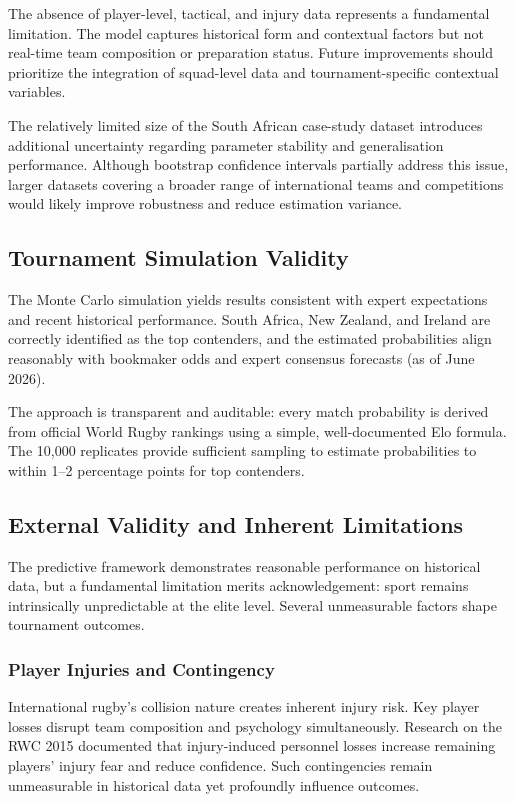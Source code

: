 \documentclass[12pt,a4paper,onecolumn]{article}
\begin{document}
The absence of player-level, tactical, and injury data represents a fundamental limitation. \cite{Williams2016,Hurley2016} The model captures historical form and contextual factors but not real-time team composition or preparation status. Future improvements should prioritize the integration of squad-level data and tournament-specific contextual variables.

The relatively limited size of the South African case-study dataset introduces additional uncertainty regarding parameter stability and generalisation performance. Although bootstrap confidence intervals partially address this issue, larger datasets covering a broader range of international teams and competitions would likely improve robustness and reduce estimation variance.

\subsection{Tournament Simulation Validity}

The Monte Carlo simulation yields results consistent with expert expectations and recent historical performance. \cite{Leitner2010} South Africa, New Zealand, and Ireland are correctly identified as the top contenders, and the estimated probabilities align reasonably with bookmaker odds and expert consensus forecasts (as of June 2026).

The approach is transparent and auditable: every match probability is derived from official World Rugby rankings using a simple, well-documented Elo formula. \cite{Elo1978} The 10,000 replicates provide sufficient sampling to estimate probabilities to within 1--2 percentage points for top contenders.

\subsection{External Validity and Inherent Limitations}

The predictive framework demonstrates reasonable performance on historical data, but a fundamental limitation merits acknowledgement: sport remains intrinsically unpredictable at the elite level. Several unmeasurable factors shape tournament outcomes.

\subsubsection{Player Injuries and Contingency}

International rugby's collision nature creates inherent injury risk. Key player losses disrupt team composition and psychology simultaneously. Research on the RWC 2015 documented that injury-induced personnel losses increase remaining players' injury fear and reduce confidence. \cite{Hurley2016} Such contingencies remain unmeasurable in historical data yet profoundly influence outcomes.
\end{document}
